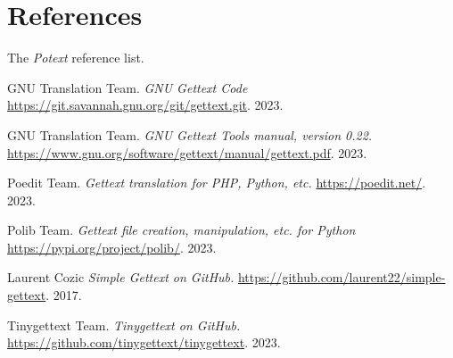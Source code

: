 %
%
%

\section{References}
\label{sec:references}

   The \textsl{Potext} reference list.

{\RaggedRight
\begin{thebibliography}{99}

   GNU Translation Team.
   \emph{GNU Gettext Code}
	\url{https://git.savannah.gnu.org/git/gettext.git}.
   2023.

   GNU Translation Team.
   \emph{GNU Gettext Tools manual, version 0.22.}
   \url{https://www.gnu.org/software/gettext/manual/gettext.pdf}.
   2023.

   Poedit Team.
   \emph{Gettext translation for PHP, Python, etc.}
   \url{https://poedit.net/}.
   2023.

   Polib Team.
   \emph{Gettext file creation, manipulation, etc. for Python}
   \url{https://pypi.org/project/polib/}.
   2023.

   Laurent Cozic
   \emph{Simple Gettext on GitHub.}
   \url{https://github.com/laurent22/simple-gettext}.
   2017.

   Tinygettext Team.
   \emph{Tinygettext on GitHub.}
   \url{https://github.com/tinygettext/tinygettext}.
   2023.

\end{thebibliography}
}


